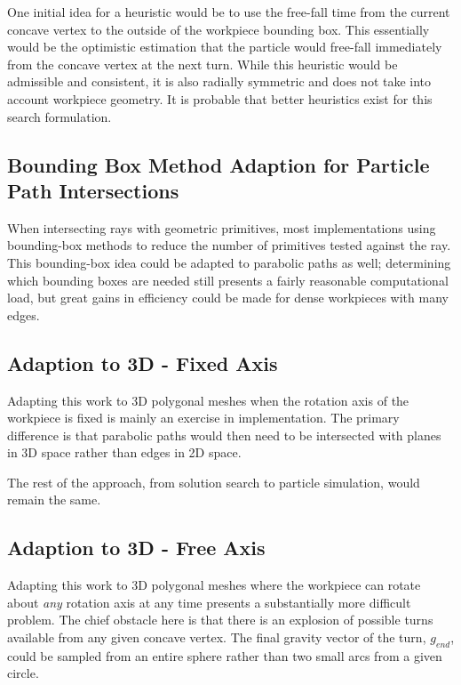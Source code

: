 One initial idea for a heuristic would be to use the free-fall time from the current concave vertex to the outside of the workpiece bounding box. This essentially would be the optimistic estimation that the particle would free-fall immediately from the concave vertex at the next turn. While this heuristic would be admissible and consistent, it is also radially symmetric and does not take into account workpiece geometry. It is probable that better heuristics exist for this search formulation.

	\subsection{Bounding Box Method Adaption for Particle Path Intersections}

When intersecting rays with geometric primitives, most implementations using bounding-box methods to reduce the number of primitives tested against the ray. This bounding-box idea could be adapted to parabolic paths as well; determining which bounding boxes are needed still presents a fairly reasonable computational load, but great gains in efficiency could be made for dense workpieces with many edges.

	\subsection{Adaption to 3D - Fixed Axis}

Adapting this work to 3D polygonal meshes when the rotation axis of the workpiece is fixed is mainly an exercise in implementation. The primary difference is that parabolic paths would then need to be intersected with planes in 3D space rather than edges in 2D space.

The rest of the approach, from solution search to particle simulation, would remain the same.

	\subsection{Adaption to 3D - Free Axis}

Adapting this work to 3D polygonal meshes where the workpiece can rotate about \emph{any} rotation axis at any time presents a substantially more difficult problem. The chief obstacle here is that there is an explosion of possible turns available from any given concave vertex. The final gravity vector of the turn, $g_{end}$, could be sampled from an entire sphere rather than two small arcs from a given circle.

